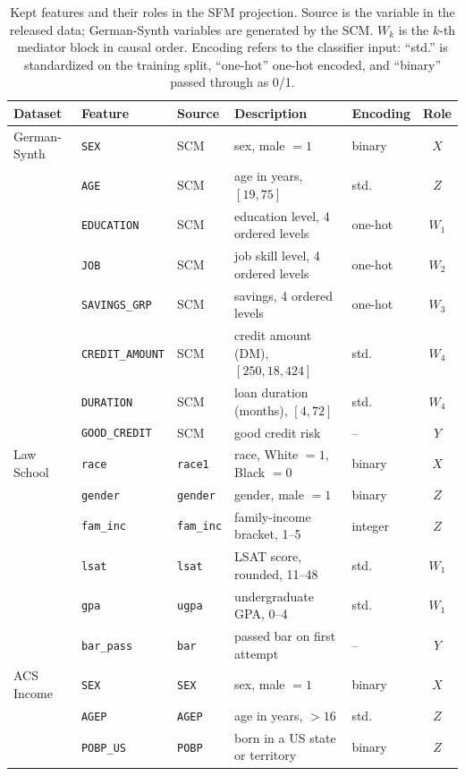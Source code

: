 \begin{table}[t]
\centering
\small
\caption{Kept features and their roles in the SFM projection. Source is the
variable in the released data; German-Synth variables are generated by the
SCM. $W_k$ is the $k$-th mediator block in causal order. Encoding refers to
the classifier input: ``std.'' is standardized on the training split,
``one-hot'' one-hot encoded, and ``binary'' passed through as 0/1.}
\label{tab:feature_map}
\setlength{\tabcolsep}{4pt}
\begin{tabular}{lllllc}
\hline
Dataset & Feature & Source & Description & Encoding & Role \\
\hline
German-Synth & \texttt{SEX} & SCM & sex, male $=1$ & binary & $X$ \\
 & \texttt{AGE} & SCM & age in years, $[19,75]$ & std. & $Z$ \\
 & \texttt{EDUCATION} & SCM & education level, 4 ordered levels & one-hot & $W_1$ \\
 & \texttt{JOB} & SCM & job skill level, 4 ordered levels & one-hot & $W_2$ \\
 & \texttt{SAVINGS\_GRP} & SCM & savings, 4 ordered levels & one-hot & $W_3$ \\
 & \texttt{CREDIT\_AMOUNT} & SCM & credit amount (DM), $[250,18{,}424]$ & std. & $W_4$ \\
 & \texttt{DURATION} & SCM & loan duration (months), $[4,72]$ & std. & $W_4$ \\
 & \texttt{GOOD\_CREDIT} & SCM & good credit risk & -- & $Y$ \\
\hline
Law School & \texttt{race} & \texttt{race1} & race, White $=1$, Black $=0$ & binary & $X$ \\
 & \texttt{gender} & \texttt{gender} & gender, male $=1$ & binary & $Z$ \\
 & \texttt{fam\_inc} & \texttt{fam\_inc} & family-income bracket, 1--5 & integer & $Z$ \\
 & \texttt{lsat} & \texttt{lsat} & LSAT score, rounded, 11--48 & std. & $W_1$ \\
 & \texttt{gpa} & \texttt{ugpa} & undergraduate GPA, 0--4 & std. & $W_1$ \\
 & \texttt{bar\_pass} & \texttt{bar} & passed bar on first attempt & -- & $Y$ \\
\hline
ACS Income & \texttt{SEX} & \texttt{SEX} & sex, male $=1$ & binary & $X$ \\
 & \texttt{AGEP} & \texttt{AGEP} & age in years, $>16$ & std. & $Z$ \\
 & \texttt{POBP\_US} & \texttt{POBP} & born in a US state or territory & binary & $Z$ \\

\end{tabular}
\end{table}
